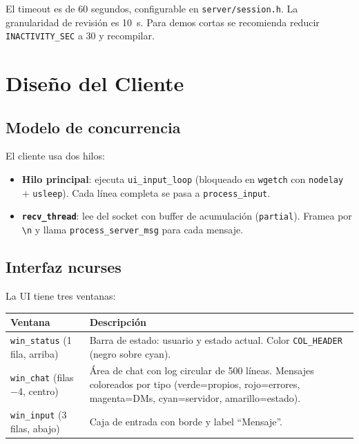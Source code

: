 \documentclass[12pt,a4paper]{article}
\begin{document}
El timeout es de 60 segundos, configurable en \texttt{server/session.h}.  La
granularidad de revisión es 10~s.  Para demos cortas se recomienda reducir
\texttt{INACTIVITY\_SEC} a 30 y recompilar.

\section{Diseño del Cliente}
\label{sec:cliente}

\subsection{Modelo de concurrencia}

El cliente usa dos hilos:

\begin{itemize}[nosep]
    \item \textbf{Hilo principal}: ejecuta \texttt{ui\_input\_loop} (bloqueado en
          \texttt{wgetch} con \texttt{nodelay} + \texttt{usleep}).  Cada línea
          completa se pasa a \texttt{process\_input}.
    \item \textbf{\texttt{recv\_thread}}: lee del socket con buffer de
          acumulación (\texttt{partial}).  Framea por \texttt{\textbackslash n} y
          llama \texttt{process\_server\_msg} para cada mensaje.
\end{itemize}

\subsection{Interfaz ncurses}

La UI tiene tres ventanas:

\begin{center}
\begin{tabular}{lp{8cm}}
\toprule
\textbf{Ventana} & \textbf{Descripción} \\
\midrule
\texttt{win\_status} (1 fila, arriba) & Barra de estado: usuario y estado actual.  Color \texttt{COL\_HEADER} (negro sobre cyan). \\
\texttt{win\_chat} (filas$-$4, centro)  & Área de chat con log circular de 500 líneas.  Mensajes coloreados por tipo (verde=propios, rojo=errores, magenta=DMs, cyan=servidor, amarillo=estado). \\
\texttt{win\_input} (3 filas, abajo)   & Caja de entrada con borde y label ``Mensaje''. \\
\bottomrule
\end{tabular}
\end{center}
\end{document}
